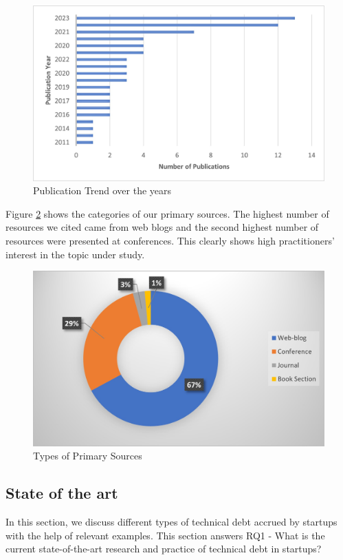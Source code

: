 \documentclass[manuscript]{acmart}
\begin{document}
\begin{figure}
  \includegraphics[width=\textwidth]{PublicationTrend.jpg}
  \caption{Publication Trend over the years}
 \label{fig:Trend}
\end{figure}

Figure \ref{fig:Sources} shows the categories of our primary sources. The highest number of resources we cited came from web blogs and the second highest number of resources were presented at conferences. This clearly shows high practitioners’ interest in the topic under study. 

\begin{figure}
  \includegraphics[width=\textwidth]{TypeSources.jpg}
  \caption{Types of Primary Sources}
 \label{fig:Sources}
\end{figure}

\subsection{State of the art}
In this section, we discuss different types of technical debt accrued by startups with the help of relevant examples. This section answers RQ1 - What is the current state-of-the-art research and practice of technical debt in startups?
\end{document}
